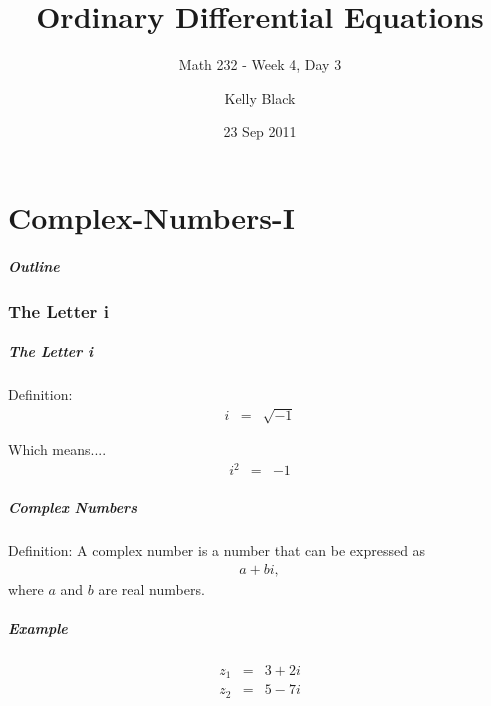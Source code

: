 \part{Complex-Numbers-I}


\title{Ordinary Differential Equations}
\subtitle{Math 232 - Week 4, Day 3}

\author{Kelly Black}
\date{23 Sep 2011}

\begin{frame}
  \titlepage
\end{frame}

\begin{frame}
  \frametitle{Outline}
\end{frame}


\section{The Letter i}


\begin{frame}
  \frametitle{The Letter i}

  Definition: 
  \begin{eqnarray*}
    i & = & \sqrt{-1} 
  \end{eqnarray*}

  Which means....
  \begin{eqnarray*}
    i^2 & = & -1
  \end{eqnarray*}

\end{frame}


\begin{frame}
  \frametitle{Complex Numbers}

  Definition: A complex number is a  number that can be expressed as
  \begin{eqnarray*}
    a + bi,
  \end{eqnarray*}
  where $a$ and $b$ are real numbers.

\end{frame}



\begin{frame}
  \frametitle{Example}

  \begin{eqnarray*}
    z_1 & = & 3 + 2i \\
    z_2 & = & 5 - 7i
  \end{eqnarray*}

\end{frame}

